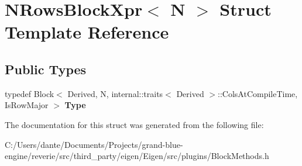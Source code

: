 \hypertarget{struct_n_rows_block_xpr}{}\section{N\+Rows\+Block\+Xpr$<$ N $>$ Struct Template Reference}
\label{struct_n_rows_block_xpr}
\subsection*{Public Types}
\begin{DoxyCompactItemize}
\item 
\mbox{\label{struct_n_rows_block_xpr_a4fbcee0ffe3913243f5bcc71e64af58d}} 
typedef Block$<$ Derived, N, internal\+::traits$<$ Derived $>$\+::Cols\+At\+Compile\+Time, Is\+Row\+Major $>$ {\bfseries Type}
\end{DoxyCompactItemize}


The documentation for this struct was generated from the following file\+:\begin{DoxyCompactItemize}
\item 
C\+:/\+Users/dante/\+Documents/\+Projects/grand-\/blue-\/engine/reverie/src/third\+\_\+party/eigen/\+Eigen/src/plugins/Block\+Methods.\+h\end{DoxyCompactItemize}
